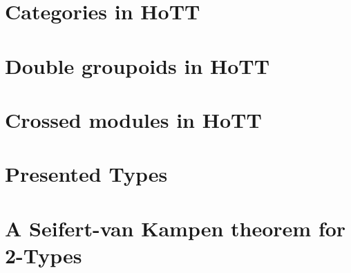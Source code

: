 \section{Categories in HoTT}

\section{Double groupoids in HoTT}

\section{Crossed modules in HoTT}

\section{Presented Types}

\section{A Seifert-van Kampen theorem for 2-Types}

